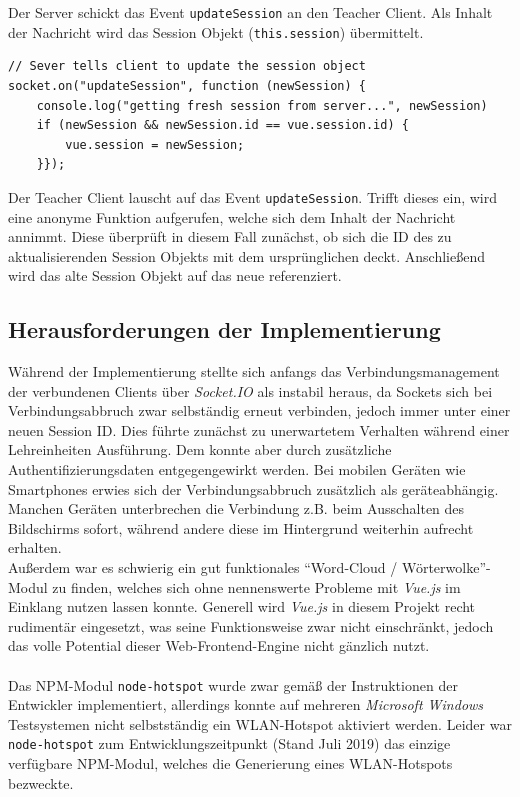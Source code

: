 Der Server schickt das Event \texttt{updateSession} an den Teacher Client.
Als Inhalt der Nachricht wird das Session Objekt (\texttt{this.session}) übermittelt.
\begin{lstlisting}[caption=Client Socket Event-Listener]
// Sever tells client to update the session object
socket.on("updateSession", function (newSession) {
	console.log("getting fresh session from server...", newSession)
	if (newSession && newSession.id == vue.session.id) {
		vue.session = newSession;
	}});
\end{lstlisting}

Der Teacher Client lauscht auf das Event \texttt{updateSession}. Trifft dieses ein,
wird eine anonyme Funktion aufgerufen, welche sich dem Inhalt der Nachricht annimmt.
Diese überprüft in diesem Fall zunächst, ob sich die ID des zu aktualisierenden Session Objekts
mit dem ursprünglichen deckt. Anschließend wird das alte Session Objekt auf das neue referenziert.  
 
\subsection{Herausforderungen der Implementierung}\label{sec:probsserver}
Während der Implementierung stellte sich anfangs das Verbindungsmanagement der verbundenen Clients über \emph{Socket.IO} als instabil heraus, da Sockets sich bei Verbindungsabbruch zwar selbständig erneut verbinden, jedoch immer unter einer neuen Session ID. Dies führte zunächst zu unerwartetem Verhalten während einer Lehreinheiten Ausführung. Dem konnte aber durch zusätzliche Authentifizierungsdaten entgegengewirkt werden. Bei mobilen Geräten wie Smartphones erwies sich der Verbindungsabbruch zusätzlich als geräteabhängig. Manchen Geräten unterbrechen die Verbindung z.B. beim Ausschalten des Bildschirms sofort, während andere diese im Hintergrund weiterhin aufrecht erhalten. \\ Außerdem war es schwierig ein gut funktionales "`Word-Cloud / Wörterwolke"'-Modul zu finden, welches sich ohne nennenswerte Probleme mit \emph{Vue.js} im Einklang nutzen lassen konnte. Generell wird \emph{Vue.js} in diesem Projekt recht rudimentär eingesetzt, was seine Funktionsweise zwar nicht einschränkt, jedoch das volle Potential dieser Web-Frontend-Engine nicht gänzlich nutzt. \\ \\ Das NPM-Modul \texttt{node-hotspot} wurde zwar gemäß der Instruktionen der Entwickler implementiert, allerdings konnte auf mehreren \emph{Microsoft Windows} Testsystemen nicht selbstständig ein WLAN-Hotspot aktiviert werden. Leider war \texttt{node-hotspot} zum Entwicklungszeitpunkt (Stand Juli 2019) das einzige verfügbare NPM-Modul, welches die Generierung eines WLAN-Hotspots bezweckte. 
 
 
 